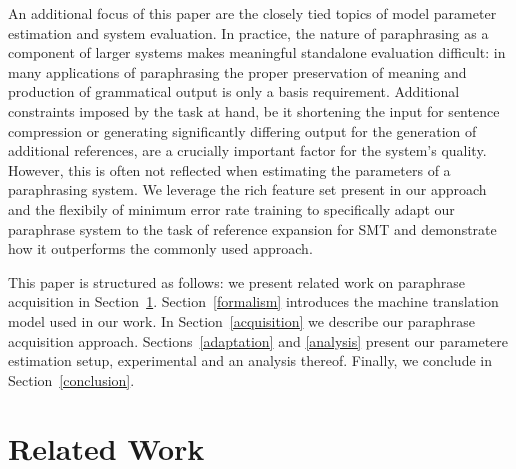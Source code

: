 \documentclass[11pt]{article}
\begin{document}
An additional focus of this paper are the closely tied topics of model
parameter estimation and system evaluation. In practice, the nature of
paraphrasing as a component of larger systems makes meaningful
standalone evaluation difficult: in many applications of paraphrasing
the proper preservation of meaning and production of grammatical
output is only a basis requirement. Additional constraints imposed by
the task at hand, be it shortening the input for sentence compression
or generating significantly differing output for the generation of
additional references, are a crucially important factor for the
system's quality. However, this is often not reflected when estimating
the parameters of a paraphrasing system. We leverage the rich feature
set present in our approach and the flexibily of minimum error rate
training to specifically adapt our paraphrase system to the task of
reference expansion for SMT and demonstrate how it outperforms the
commonly used approach.

This paper is structured as follows: we present related work on
paraphrase acquisition in
Section~\ref{related_work}. Section~\ref{formalism} introduces the
machine translation model used in our work. In
Section~\ref{acquisition} we describe our paraphrase acquisition
approach. Sections~\ref{adaptation} and \ref{analysis} present our
parametere estimation setup, experimental and an analysis
thereof. Finally, we conclude in Section~\ref{conclusion}.

\section{Related Work} \label{related_work}
\end{document}
